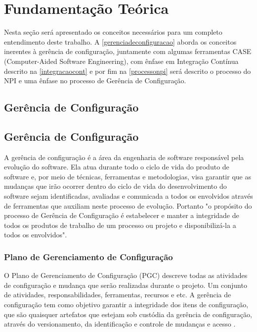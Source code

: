 \chapter{Fundamentação Teórica}\label{fundamentacao}
Nesta seção será apresentado os conceitos necessários para um completo entendimento deste trabalho. A \autoref{gerenciadeconfiguracao} aborda os conceitos inerentes à gerência de configuração, juntamente com algumas ferramentas CASE (Computer-Aided Software Engineering), com ênfase em Integração Contínua descrito na \autoref{integracaocont} e por fim na \autoref{processonpi} será descrito o processo do NPI e uma ênfase no processo de Gerência de Configuração.

\section{Gerência de Configuração}\label{gerenciadeconfiguracao}
\section{Gerência de Configuração}\label{gerenciadeconfiguracao}
A gerência de configuração é a área da engenharia de software responsável pela evolução do software. Ela atua durante todo o ciclo de vida do produto de software e, por meio de técnicas, ferramentas e metodologias, visa garantir que as mudanças que irão ocorrer dentro do ciclo de vida do desenvolvimento do software sejam identificadas, avaliadas e comunicada a todos os envolvidos através de ferramentas que auxiliam neste processo de evolução.
Portanto "o propósito do processo de Gerência de Configuração é estabelecer e manter a integridade de todos os produtos de trabalho de um processo ou projeto e disponibilizá-la a todos os envolvidos"\space\cite{mpsbr}.
\subsection{Plano de Gerenciamento de Configuração}\label{pgc}
O Plano de Gerenciamento de Configuração (PGC) descreve todas as atividades de configuração e mudança que serão realizadas durante o projeto. Um conjunto de atividades, responsabilidades, ferramentas, recursos e etc. A gerência de configuração tem como objetivo garantir a integridade dos itens de configuração, que são quaisquer artefatos que estejam sob custódia da gerência de configuração, através do versionamento, da identificação e controle de mudanças e acesso \cite{pressman2010}. 

